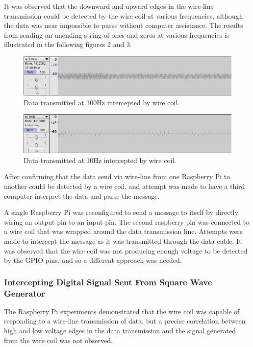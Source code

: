 \documentclass{article}
\begin{document}
It was observed that the downward and upward edges in the wire-line transmission could be detected by the wire coil at various frequencies, although the data  was near impossible to parse without computer assistance. The results from sending an unending string of ones and zeros at various frequencies is illustrated in the following figures 2 and 3.

\begin{figure}
	\includegraphics[width=\linewidth]{images/100hz.png}
	\caption{Data transmitted at 100Hz intercepted by wire coil.}
	\label{fig:100hz}
\end{figure}

\begin{figure}
	\includegraphics[width=\linewidth]{images/10hz.png}
	\caption{Data transmitted at 10Hz intercepted by wire coil.}
	\label{fig:10hz}
\end{figure}

After confirming that the data send via wire-line from one Raspberry Pi to another could be detected by a wire coil, and attempt was made to have a third computer interpret the data and parse the message.

A single Raspberry Pi was reconfigured to send a message to itself by directly wiring an output pin to an input pin. The second raspberry pin was connected to a wire coil that was wrapped around the data transmission line. Attempts were made to intercept the message as it was transmitted through the data cable. It was observed that the wire coil was not producing enough voltage to be detected by the GPIO pins, and so a different approach was needed.

\subsubsection{Intercepting Digital Signal Sent From Square Wave Generator}

The Raspberry Pi experiments demonstrated that the wire coil was capable of responding to a wire-line transmission of data, but a precise correlation between high and low voltage edges in the data transmission and the signal generated from the wire coil was not observed.
\end{document}
